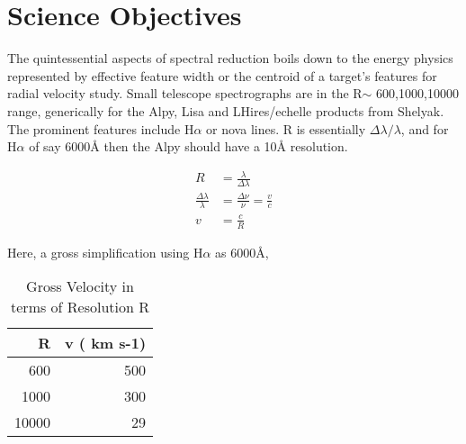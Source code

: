 \documentclass[letter,11pt,oneside]{article}
\begin{document}
\appendix
\renewcommand \thesection{\Alph{section}}

\section{Science Objectives}


The quintessential aspects of spectral reduction boils down to the
energy physics represented by effective feature width or the centroid
of a target's features for radial velocity study. Small telescope
spectrographs are in the R$\sim$ 600,1000,10000 range, generically
for the Alpy, Lisa and LHires/echelle products from Shelyak.
The prominent features include H$\alpha$ or nova lines. R is
essentially $\Delta{\lambda}/\lambda$, and for H$\alpha$ of
say 6000\AA\; then the Alpy should have a 10\AA\; resolution.


\begin{align}
R &= \frac{\lambda}{\Delta{\lambda}} \\
\frac{\Delta{\lambda}}{\lambda} &= \frac{\Delta{\nu}}{\nu} = \frac{v}{c} \\
v &= \frac{c}{R}
\end{align}

Here, a gross simplification using H$\alpha$ as 6000\AA\;, 

\begin{table}[h!]
\centering
\begin{tabular}{| r | r |}
\hline
R      & v ( km s-1)    \\ 
\hline
600    & 500    \\ 
1000   & 300    \\ 
10000  & 29    \\ 
\hline
\end{tabular}
\caption{Gross Velocity in terms of Resolution R}
\label{table:GrossVelocityintermsofResolutionR}
\end{table}

\end{document}

